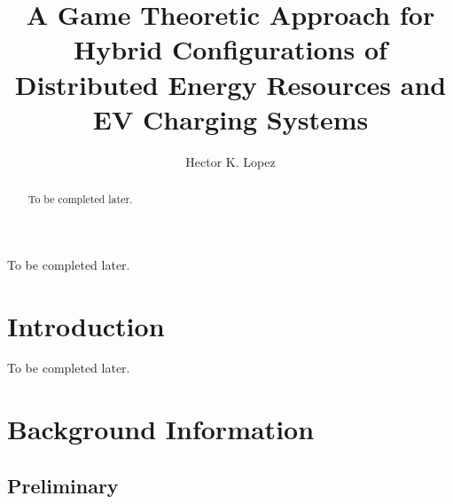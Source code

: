 \documentclass[phd, 12pt, print]{fauthesis}
\title{A Game Theoretic Approach for Hybrid Configurations of 
Distributed Energy Resources and EV Charging Systems}
\author{Hector K. Lopez}
\begin{document}
\frontmatter
\maketitle
\makecopyright
\makesignature
\begin{acknowledgements}
  To be completed later.
\end{acknowledgements}
\begin{abstract}
  To be completed later.
\end{abstract}
\tableofcontents
\nolistoftables					%
\listoffigures					%

\mainmatter

\chapter{Introduction} %

To be completed later.

\chapter{Background Information} %

\label{Chapter2} 


\section{Preliminary}
\end{document}
